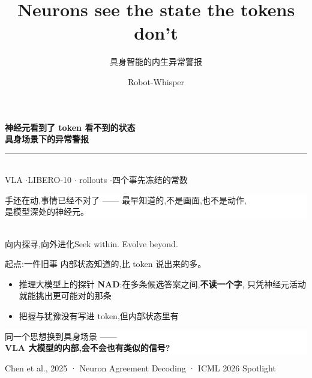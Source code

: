 \documentclass[aspectratio=169,10pt]{beamer}
\title{Neurons see the state the tokens don't}
\subtitle{具身智能的内生异常警报}
\author{Robot-Whisper}
\date{}
\newcommand{\hi}[1]{{\color{teal}\bfseries #1}}
\newcommand{\wi}[1]{{\color{gold}\bfseries #1}}
\newcommand{\dimm}[1]{{\footnotesize\color{gray2}#1}}
\newcommand{\lead}[1]{{\large\color{teal}#1}\par\medskip}
\begin{document}
{
\begin{frame}[plain]
  \vspace{1.1cm}
  \begin{center}
    {\LARGE\color{teal}\bfseries 神经元看到了 token 看不到的状态}\\[4pt]
    {\LARGE\color{gold}\bfseries 具身场景下的异常警报}\\[16pt]
    {\color{gray2}\rule{7cm}{0.4pt}}\\[12pt]
    {\small VLA \quad$\cdot$\quad LIBERO-10 \quad$\cdot$ rollouts \quad$\cdot$\quad 四个事先冻结的常数}\\[18pt]
    \colorbox{white}{\parbox{0.72\textwidth}{\centering\vspace{3pt}\small
      手还在动,事情已经不对了 —— 最早知道的,不是画面,也不是动作,\\
      是模型深处的神经元。\vspace{3pt}}}\\[18pt]
    {\footnotesize\color{gray2}向内探寻,向外进化\qquad Seek within. Evolve beyond.}
  \end{center}
\end{frame}}

\begin{frame}{起点:一件旧事}
  \lead{内部状态知道的,比 token 说出来的多。}
  \begin{itemize}
    \item 推理大模型上的探针 \hi{NAD}:在多条候选答案之间,\textbf{不读一个字},
          只凭神经元活动就能挑出更可能对的那条
    \item 把握与犹豫没有写进 token,但内部状态里有
  \end{itemize}
  \vfill
  \begin{center}
    \colorbox{white}{\parbox{0.86\textwidth}{\centering\vspace{2pt}
      \large 同一个思想换到具身场景 ——\\[3pt]
      \wi{VLA 大模型的内部,会不会也有类似的信号?}\vspace{4pt}}}
  \end{center}
  \vfill
  \dimm{Chen et al., 2025 · Neuron Agreement Decoding · ICML 2026 Spotlight}
\end{frame}
\end{document}
